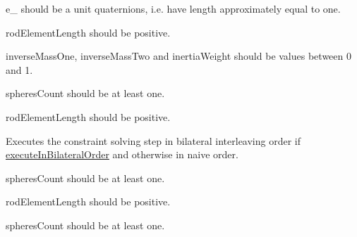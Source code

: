 \begin{DoxyRefList}
{\ttfamily e\+\_} should be a unit quaternions, i.\+e. have length approximately equal to one. 



{\ttfamily rod\+Element\+Length} should be positive. 



{\ttfamily inverse\+Mass\+One}, {\ttfamily inverse\+Mass\+Two} and {\ttfamily inertia\+Weight} should be values between 0 and 1.  
\item[Member \mbox{\hyperlink{class_guidewire_sim_1_1_constraint_solving_step_a53ec7b275d2ef802184f30dd7d405d4c}{Guidewire\+Sim.Constraint\+Solving\+Step.Solve\+Stretch\+Constraints}} (Vector3\mbox{[}\mbox{]} sphere\+Position\+Predictions, BSM.\+Quaternion\mbox{[}\mbox{]} cylinder\+Orientation\+Predictions, int spheres\+Count, BSM.\+Quaternion\mbox{[}\mbox{]} world\+Space\+Basis, float rod\+Element\+Length)]\label{requirement__requirement000001}%
%
 {\ttfamily spheres\+Count} should be at least one. 



{\ttfamily rod\+Element\+Length} should be positive. 



Executes the constraint solving step in bilateral interleaving order if \mbox{\hyperlink{class_guidewire_sim_1_1_constraint_solving_step_a5bfee8881a0d715c12f2b8f9cd72df89}{execute\+In\+Bilateral\+Order}} and otherwise in naive order.  
\item[Member \mbox{\hyperlink{class_guidewire_sim_1_1_constraint_solving_step_ac2f99613fb119ff66d0d9f630b4059b8}{Guidewire\+Sim.Constraint\+Solving\+Step.Solve\+Stretch\+Constraints\+In\+Bilateral\+Order}} (Vector3\mbox{[}\mbox{]} sphere\+Position\+Predictions, BSM.\+Quaternion\mbox{[}\mbox{]} cylinder\+Orientation\+Predictions, int spheres\+Count, float rod\+Element\+Length, BSM.\+Quaternion e\+\_\+3)]\label{requirement__requirement000003}%
%
 {\ttfamily spheres\+Count} should be at least one. 



{\ttfamily rod\+Element\+Length} should be positive.  
\item[Member \mbox{\hyperlink{class_guidewire_sim_1_1_constraint_solving_step_aa31751d785d40d352c516bdd8df5f89b}{Guidewire\+Sim.Constraint\+Solving\+Step.Solve\+Stretch\+Constraints\+In\+Naive\+Order}} (Vector3\mbox{[}\mbox{]} sphere\+Position\+Predictions, BSM.\+Quaternion\mbox{[}\mbox{]} cylinder\+Orientation\+Predictions, int spheres\+Count, float rod\+Element\+Length, BSM.\+Quaternion e\+\_\+3)]\label{requirement__requirement000004}%
%
 {\ttfamily spheres\+Count} should be at least one. 




\end{DoxyRefList}
